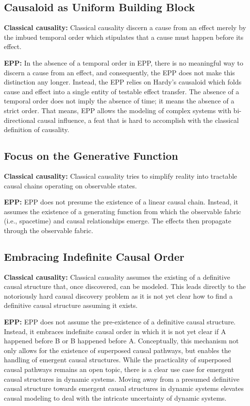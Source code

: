 \subsection{Causaloid as Uniform Building Block}

\textbf{Classical causality:} 
Classical causality discern a cause from an effect merely by the imbued temporal order which stipulates that a cause must happen before its effect.

\textbf{EPP:} 
In the absence of a temporal order in EPP, there is no meaningful way to discern a cause from an effect, and consequently, the EPP does not make this distinction any longer. Instead, the EPP relies on Hardy’s causaloid which folds cause and effect into a single entity of testable effect transfer.
The absence of a temporal order does not imply the absence of time; it means the absence of a strict order. That means, EPP allows the modeling of complex systems with bi-directional causal influence, a feat that is hard to accomplish with the classical definition of causality.

\newpage

\subsection{Focus on the Generative Function}

\textbf{Classical causality:} 
Classical causality tries to simplify reality into tractable causal chains operating on observable states.


\textbf{EPP:} 
EPP does not presume the existence of a linear causal chain. Instead, it assumes the existence of a generating function from which the observable fabric (i.e., spacetime) and causal relationships emerge. The effects then propagate through the observable fabric.

\subsection{Embracing Indefinite Causal Order}

\textbf{Classical causality:} 
Classical causality assumes the existing of a definitive causal structure that, once discovered, can be modeled. This leads directly to the notoriously hard causal discovery problem as it is not yet clear how to find a definitive causal structure assuming it exists.

\textbf{EPP:} 
EPP does not assume the pre-existence of a definitive causal structure. Instead, it embraces indefinite causal order in which it is not yet clear if A happened before B or B happened before A. Conceptually, this mechanism not only allows for the existence of superposed causal pathways, but enables the handling of emergent causal structures. While the practicality of superposed causal pathways remains an open topic, there is a clear use case for emergent causal structures in dynamic systems. Moving away from a presumed definitive causal structure towards emergent causal structures in dynamic systems elevates causal modeling to deal with the intricate uncertainty of dynamic systems.
